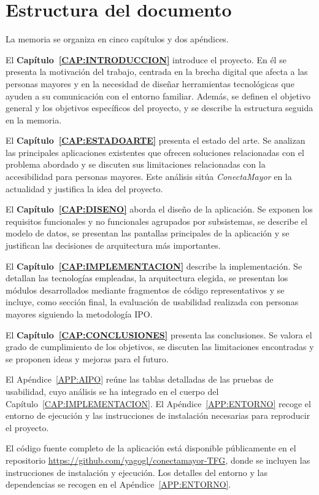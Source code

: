 \section{Estructura del documento\label{SEC:ESTRUCTURA}}

La memoria se organiza en cinco capítulos y dos apéndices.

El \textbf{Capítulo~\ref{CAP:INTRODUCCION}} introduce el proyecto. En él se
presenta la motivación del trabajo, centrada en la brecha digital que afecta a
las personas mayores y en la necesidad de diseñar herramientas tecnológicas que ayuden a su comunicación con el entorno familiar. Además, se
definen el objetivo general y los objetivos específicos del proyecto, y se
describe la estructura seguida en la memoria.

El \textbf{Capítulo~\ref{CAP:ESTADOARTE}} presenta el estado del arte. Se
analizan las principales aplicaciones existentes que ofrecen soluciones
relacionadas con el problema abordado y se discuten sus limitaciones relacionadas con la accesibilidad para personas mayores. Este análisis sitúa
\emph{ConectaMayor} en la actualidad y justifica la idea del
proyecto.

El \textbf{Capítulo~\ref{CAP:DISENO}} aborda el diseño de la aplicación. Se
exponen los requisitos funcionales y no funcionales agrupados por subsistemas,
se describe el modelo de datos, se presentan las pantallas principales de la aplicación y se justifican las decisiones de arquitectura más importantes.

El \textbf{Capítulo~\ref{CAP:IMPLEMENTACION}} describe la implementación. Se
detallan las tecnologías empleadas, la arquitectura elegida, se presentan los
módulos desarrollados mediante fragmentos de código representativos y se
incluye, como sección final, la evaluación de usabilidad realizada con personas
mayores siguiendo la metodología IPO.

El \textbf{Capítulo~\ref{CAP:CONCLUSIONES}} presenta las conclusiones. Se valora
el grado de cumplimiento de los objetivos, se discuten las limitaciones
encontradas y se proponen ideas y mejoras para el futuro.

El Apéndice~\ref{APP:AIPO} reúne las tablas detalladas de las pruebas de
usabilidad, cuyo análisis se ha integrado en el cuerpo del
Capítulo~\ref{CAP:IMPLEMENTACION}. El Apéndice~\ref{APP:ENTORNO} recoge el
entorno de ejecución y las instrucciones de instalación necesarias para
reproducir el proyecto.

El código fuente completo de la aplicación está disponible públicamente en el
repositorio \url{https://github.com/yagogl/conectamayor-TFG}, donde se incluyen
las instrucciones de instalación y ejecución. Los detalles del entorno y las
dependencias se recogen en el Apéndice~\ref{APP:ENTORNO}.